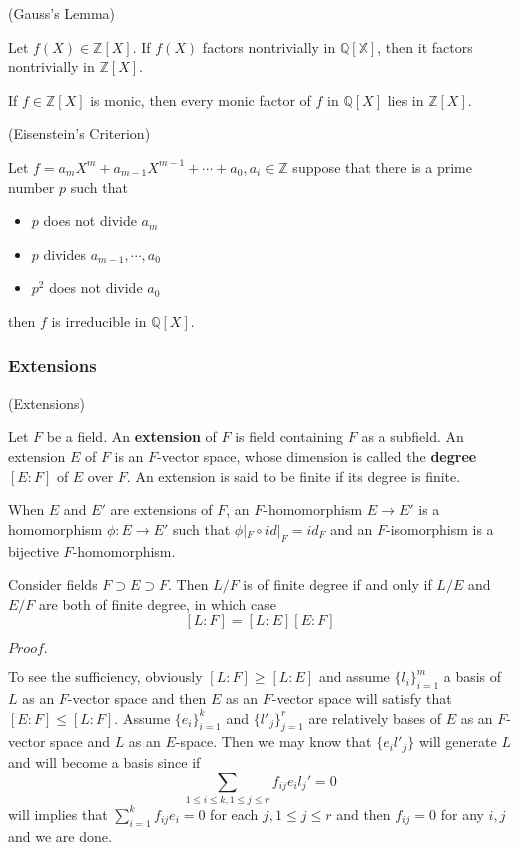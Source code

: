 \documentclass{article}
\newcommand{\Pf}[1]{$Proof.$\par}
\begin{document}
\begin{proposition}
    (Gauss's Lemma)\par
    Let $f(X) \in \mathbb{Z}[X]$. If $f(X)$ factors nontrivially in $\mathbb{Q[X]}$, then it factors nontrivially in $\mathbb{Z}[X]$.
\end{proposition}

\begin{proposition}
    If $f\in \mathbb{Z}[X]$ is monic, then every monic factor of $f$ in $\mathbb{Q}[X]$ lies in $\mathbb{Z}[X]$.
\end{proposition}

\begin{proposition}
    (Eisenstein's Criterion)\par
    Let $f = a_m X^m + a_{m-1}X^{m-1}+\cdots + a_0, a_i \in \mathbb{Z}$
    suppose that there is a prime number $p$ such that
    \begin{itemize}
        \item $p$ does not divide $a_m$
        \item $p$ divides $a_{m-1},\cdots,a_0$
        \item $p^2$ does not divide $a_0$
    \end{itemize}
    then $f$ is irreducible in $\mathbb{Q}[X]$.
\end{proposition}

\subsubsection{Extensions}

\begin{definition}
    (Extensions)\par
    Let $F$ be a field. An \textbf{extension} of $F$ is field containing $F$ as a subfield. An extension $E$ of $F$ is an $F$-vector space, whose dimension is called the \textbf{degree} $[E:F]$ of $E$ over $F$. An extension is said to be finite if its degree is finite.\par
    When $E$ and $E'$ are extensions of $F$, an $F$-homomorphism $E\to E'$ is a homomorphism $\phi:E\to E'$ such that $\phi|_F\circ id|_F = id_F$ and an $F$-isomorphism is a bijective $F$-homomorphism.
\end{definition}

\begin{proposition}
    Consider fields $F\supset E \supset F$. Then $L/F$ is of finite degree if and only if $L/E$ and $E/F$ are both of finite degree, in which case
    \[[L:F] = [L:E][E:F]\]
\end{proposition}
\Pf\par
    To see the sufficiency, obviously $[L:F] \geq [L:E]$ and assume $\{l_i\}_{i=1}^m$ a basis of $L$ as an $F$-vector space and then $E$ as an $F$-vector space will satisfy that $[E:F] \leq [L:F]$. Assume $\{e_i\}_{i=1}^k$ and $\{l'_j\}_{j=1}^r$ are relatively bases of $E$ as an $F$-vector space and $L$ as an $E$-space. Then we may know that $\{e_il'_j\}$ will generate $L$ and will become a basis since if
    \[
    \sum\limits_{1\leq i \leq k,1\leq j \leq r} f_{ij}e_il_j' = 0 
    \]
    will implies that $\sum\limits_{i=1}^k f_{ij}e_i = 0$ for each $j, 1\leq j\leq r$ and then $f_{ij} = 0$ for any $i,j$ and we are done.
\end{document}
